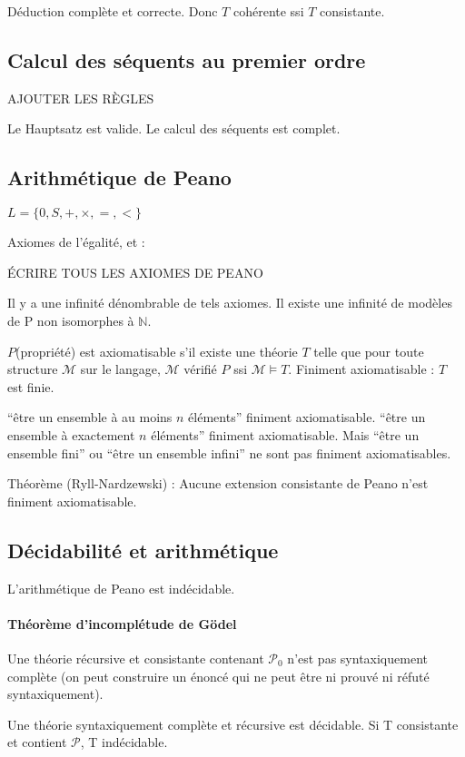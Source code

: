 \documentclass[french]{article}
\begin{document}
Déduction complète et correcte. Donc $T$ cohérente ssi $T$ consistante.

\subsection{Calcul des séquents au premier ordre}
AJOUTER LES RÈGLES

Le Hauptsatz est valide. Le calcul des séquents est complet.

\subsection{Arithmétique de Peano}
$L = \{0,S,+,\times,=,<\}$

Axiomes de l'égalité, et :

ÉCRIRE TOUS LES AXIOMES DE PEANO

Il y a une infinité dénombrable de tels axiomes. Il existe une infinité de modèles de P non isomorphes à $\mathbb{N}$.

$P$(propriété) est axiomatisable s'il existe une théorie $T$ telle que pour toute structure $\mathcal{M}$ sur le langage, $\mathcal{M}$ vérifié $P$ ssi $\mathcal{M}\models T$. Finiment axiomatisable : $T$ est finie.

``être un ensemble à au moins $n$ éléments'' finiment axiomatisable.
``être un ensemble à exactement $n$ éléments'' finiment axiomatisable.
Mais ``être un ensemble fini'' ou ``être un ensemble infini'' ne sont pas finiment axiomatisables.

Théorème (Ryll-Nardzewski) : Aucune extension consistante de Peano n'est finiment axiomatisable.

\subsection{Décidabilité et arithmétique}
L'arithmétique de Peano est indécidable.
\paragraph{Théorème d'incomplétude de Gödel} Une théorie récursive et consistante contenant $\mathcal{P}_0$ n'est pas syntaxiquement complète (on peut construire un énoncé qui ne peut être ni prouvé ni réfuté syntaxiquement).

Une théorie syntaxiquement complète et récursive est décidable. Si T consistante et contient $\mathcal{P}$, T indécidable.
\end{document}
